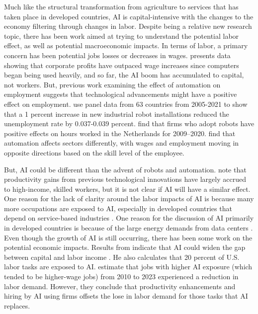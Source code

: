 \documentclass[
  authoryear,
  doubleblind]{elsarticle}
\begin{document}
Much like the structural transformation from agriculture to services
that has taken place in developed countries, AI is capital-intensive
with the changes to the economy filtering through changes in labor.
Despite being a relative new research topic, there has been work aimed
at trying to understand the potential labor effect, as well as potential
macroeconomic impacts. In terms of labor, a primary concern has been
potential jobs losses or decreases in wages. \citet{irwin} presents data
showing that corporate profits have outpaced wage increases since
computers began being used heavily, and so far, the AI boom has
accumulated to capital, not workers. But, previous work examining the
effect of automation on employment suggests that technological
advancements might have a positive effect on employment.
\citet{fang2024} use panel data from 63 countries from 2005-2021 to show
that a 1 percent increase in new industrial robot installations reduced
the unemployment rate by 0.037-0.039 percent. \citet{acemoglu} find that
firms who adopt robots have positive effects on hours worked in the
Netherlands for 2009--2020. \citet{autor2025} find that automation
affects sectors differently, with wages and employment moving in
opposite directions based on the skill level of the employee.

But, AI could be different than the advent of robots and automation.
\citet{weinstock} note that productivity gains from previous
technological innovations have largely accrued to high-income, skilled
workers, but it is not clear if AI will have a similar effect. One
reason for the lack of clarity around the labor impacts of AI is because
many more occupations are exposed to AI, especially in developed
countries that depend on service-based industries \citep{unctad2025}.
One reason for the discussion of AI primarily in developed countries is
because of the large energy demands from data centers \citep{mills2025}.
Even though the growth of AI is still occurring, there has been some
work on the potential economic impacts. Results from
\citet{acemoglu2025} indicate that AI could widen the gap between
capital and labor income \citep[as noted in][]{irwin}. He also
calculates that 20 percent of U.S. labor tasks are exposed to AI.
\citet{hampole2025} estimate that jobs with higher AI exposure (which
tended to be higher-wage jobs) from 2010 to 2023 experienced a reduction
in labor demand. However, they conclude that productivity enhancements
and hiring by AI using firms offsets the lose in labor demand for those
tasks that AI replaces.
\end{document}
